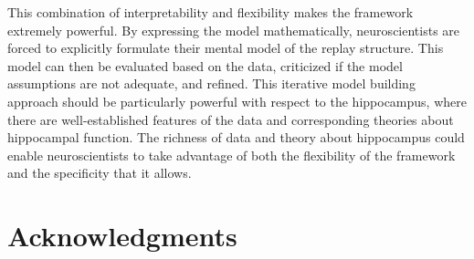 \documentclass[conference]{IEEEtran}
\begin{document}
This combination of interpretability and flexibility makes the framework extremely powerful. By expressing the model mathematically, neuroscientists are forced to explicitly formulate their mental model of the replay structure. This model can then be evaluated based on the data, criticized if the model assumptions are not adequate, and refined. This iterative model building approach should be particularly powerful with respect to the hippocampus, where there are well-established features of the data and corresponding theories about hippocampal function. The richness of data and theory about hippocampus could enable neuroscientists to take advantage of both the flexibility of the framework and the specificity that it allows.


\section*{Acknowledgments}
\printbibliography
\end{document}
